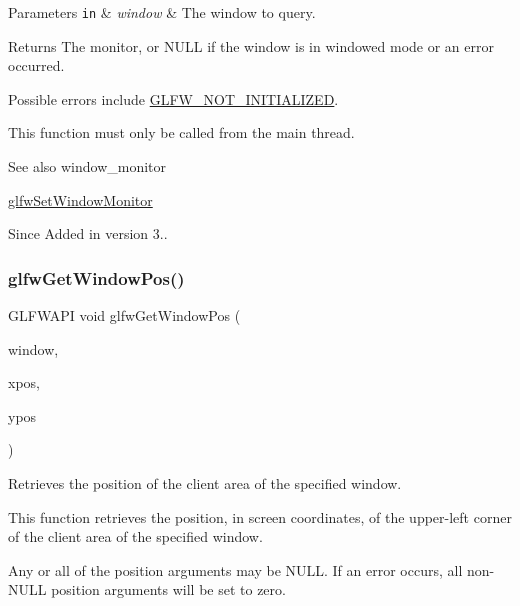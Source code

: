 \begin{DoxyParams}[1]{Parameters}
\mbox{\tt in}  & {\em window} & The window to query. \\
\hline
\end{DoxyParams}
\begin{DoxyReturn}{Returns}
The monitor, or {\ttfamily N\+U\+LL} if the window is in windowed mode or an error occurred.
\end{DoxyReturn}
Possible errors include \hyperlink{group__errors_ga2374ee02c177f12e1fa76ff3ed15e14a}{G\+L\+F\+W\+\_\+\+N\+O\+T\+\_\+\+I\+N\+I\+T\+I\+A\+L\+I\+Z\+ED}.

This function must only be called from the main thread.

\begin{DoxySeeAlso}{See also}
window\+\_\+monitor 

\hyperlink{group__window_ga12fabf78575e59c00f822f323ae0b6ae}{glfw\+Set\+Window\+Monitor}
\end{DoxySeeAlso}
\begin{DoxySince}{Since}
Added in version 3.. 
\end{DoxySince}
\mbox{\label{group__window_ga0076a8591ef7494d359730cf2250b45b}} 
\subsubsection{\texorpdfstring{glfw\+Get\+Window\+Pos()}{glfwGetWindowPos()}}
{\footnotesize\ttfamily G\+L\+F\+W\+A\+PI void glfw\+Get\+Window\+Pos (\begin{DoxyParamCaption}\item[{\hyperlink{group__window_ga3c96d80d363e67d13a41b5d1821f3242}{G\+L\+F\+Wwindow} $\ast$}]{window,  }\item[{int $\ast$}]{xpos,  }\item[{int $\ast$}]{ypos }\end{DoxyParamCaption})}



Retrieves the position of the client area of the specified window. 

This function retrieves the position, in screen coordinates, of the upper-\/left corner of the client area of the specified window.

Any or all of the position arguments may be {\ttfamily N\+U\+LL}. If an error occurs, all non-\/{\ttfamily N\+U\+LL} position arguments will be set to zero.


